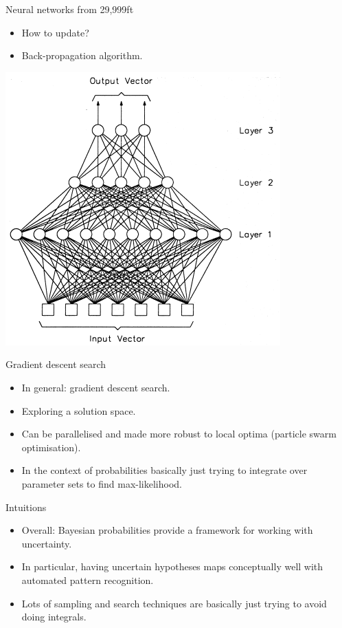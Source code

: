 \documentclass{beamer}
\begin{document}
\begin{frame}{Neural networks from 29,999ft}
  \begin{itemize}
    \item How to update?
    \item Back-propagation algorithm.
  \end{itemize}

  \begin{center}
    \includegraphics[scale=0.4]{multi}
  \end{center}
\end{frame}

\begin{frame}{Gradient descent search}
  \begin{itemize}
    \item In general: gradient descent search.
    \item Exploring a solution space.
    \item Can be parallelised and made more robust to local optima
      (particle swarm optimisation).
    \item In the context of probabilities basically just trying to
      integrate over parameter sets to find max-likelihood.
  \end{itemize}
\end{frame}

\begin{frame}{Intuitions}
  \begin{itemize}
    \item Overall: Bayesian probabilities provide a framework for
      working with uncertainty.
    \item In particular, having uncertain hypotheses maps conceptually
      well with automated pattern recognition.
    \item Lots of sampling and search techniques are basically just
      trying to avoid doing integrals.
  \end{itemize}
\end{frame}
\end{document}
